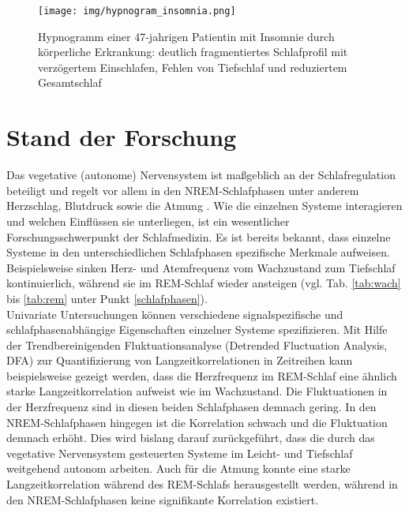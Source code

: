 \begin{figure}[H]
	\centering
	\texttt{[image: img/hypnogram\_insomnia.png]}
	\caption[Hypnogramm von gestörtem Schlaf]{Hypnogramm einer 47-jahrigen Patientin mit Insomnie durch körperliche Erkrankung: deutlich fragmentiertes Schlafprofil mit verzögertem Einschlafen, Fehlen von Tiefschlaf und reduziertem Gesamtschlaf  \parencite{happe_schlafmedizin_2009}}
	\label{fig:hypnogram_insomnia}
\end{figure}

\section{Stand der Forschung}\label{stand} 

Das vegetative (autonome) Nervensystem ist maßgeblich an der Schlafregulation beteiligt und regelt vor allem in den \acs{NREM}-Schlafphasen unter anderem Herzschlag, Blutdruck sowie die Atmung \parencite{steinberg_schlafmedizin_2010}. Wie die einzelnen Systeme interagieren und welchen Einflüssen sie unterliegen, ist ein wesentlicher Forschungsschwerpunkt der Schlafmedizin. Es ist bereits bekannt, dass einzelne Systeme in den unterschiedlichen Schlafphasen spezifische Merkmale aufweisen. Beispielsweise sinken Herz- und Atemfrequenz vom Wachzustand zum Tiefschlaf kontinuierlich, während sie im REM-Schlaf wieder ansteigen (vgl. Tab. \ref{tab:wach} bis \ref{tab:rem} unter Punkt \ref{schlafphasen}). \parencite{lee-chiong_sleep_2008, rasche_update_2003, penzel_schlafstorungen_2005}\\

Univariate Untersuchungen können verschiedene signalspezifische und schlafphasenabhängige Eigenschaften einzelner Systeme spezifizieren. Mit Hilfe der Trendbereinigenden Fluktuationsanalyse (Detrended Fluctuation Analysis, DFA) zur Quantifizierung von Langzeitkorrelationen in Zeitreihen kann beispielsweise gezeigt werden, dass die Herzfrequenz im \acs{REM}-Schlaf eine ähnlich starke Langzeitkorrelation aufweist wie im Wachzustand. Die Fluktuationen in der Herzfrequenz sind in diesen beiden Schlafphasen demnach gering. In den \acs{NREM}-Schlafphasen hingegen ist die Korrelation schwach und die Fluktuation demnach erhöht. Dies wird bislang darauf zurückgeführt, dass die durch das vegetative Nervensystem gesteuerten Systeme im Leicht- und Tiefschlaf weitgehend autonom arbeiten. Auch für die Atmung konnte eine starke Langzeitkorrelation während des \acs{REM}-Schlafs herausgestellt werden, während in den \acs{NREM}-Schlafphasen keine signifikante Korrelation existiert. \parencite{penzel_cardiovascular_2007}\\

